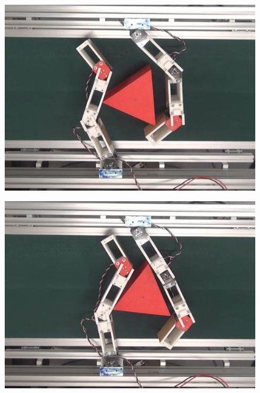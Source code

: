 \documentclass[a4paper,twoside,12pt,papersize, dvipdfmx]{iirthesis}
\begin{document}
\begin{figure}[hbt]
\centering
\begin{minipage}{0.249\hsize}
\centering
\includegraphics[width=0.98\hsize]{fig/4-manipulation-result/Triangle/2-1.jpg}
\subcaption{}\label{}
\end{minipage}\hfill
\begin{minipage}{0.249\hsize}
\centering
\includegraphics[width=0.98\hsize]{fig/4-manipulation-result/Triangle/2-2.jpg}
\subcaption{}\label{}
\end{minipage}\hfill
\begin{minipage}{0.249\hsize}
\centering

\end{minipage}
\end{figure}
\end{document}
